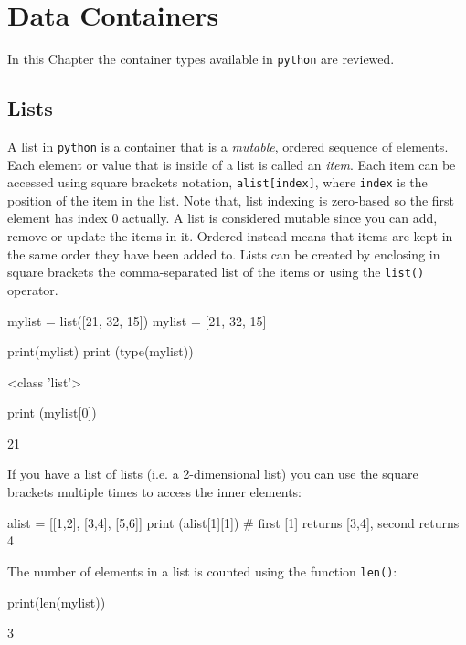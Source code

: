 \chapter{Data Containers}
\label{sec:datacontainer}

In this Chapter the container types available in \texttt{python} are reviewed.

\section{Lists}
\label{lists}

A list in \texttt{python} is a container that is a \emph{mutable}, ordered sequence of elements. Each element or value that is inside of a list is called an \emph{item}. Each item can be accessed using square brackets notation, \texttt{alist[index]}, where \texttt{index} is the position of the item in the list.
Note that, list indexing is zero-based so the first element has index 0 actually. A list is considered mutable since you can add, remove or update the items in it. Ordered instead means that items are kept in the same order they have been added to. Lists can be created by enclosing in square brackets the comma-separated list of the items or using the \texttt{list()} operator.

\begin{ipython}
mylist = list([21, 32, 15])
mylist = [21, 32, 15]

print(mylist)
print (type(mylist))
\end{ipython}
\begin{ioutput}
[21, 32, 15]
<class 'list'>
\end{ioutput}

\begin{ipython}
print (mylist[0])
\end{ipython}
\begin{ioutput}
21
\end{ioutput}

If you have a list of lists (i.e. a 2-dimensional list) you can use the square brackets multiple times to access the inner elements:
\begin{ipython}
alist = [[1,2], [3,4], [5,6]]
print (alist[1][1]) # first [1] returns [3,4], second returns 4                 
\end{ipython}  

The number of elements in a list is counted using the function \texttt{len()}:
\begin{ipython}
print(len(mylist))
\end{ipython}
\begin{ioutput}
3
\end{ioutput}

